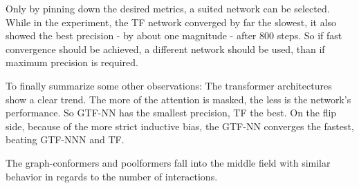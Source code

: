 Only by pinning down the desired metrics, a suited network can be selected. 
While in the experiment, the TF network converged by far the slowest, it also showed the best precision - by about one magnitude - after 800 steps. 
So if fast convergence should be achieved, a different network should be used, than if maximum precision is required.

To finally summarize some other observations: The transformer architectures show a clear trend. 
The more of the attention is masked, the less is the network's performance. 
So GTF-NN has the smallest precision, TF the best. On the flip side, because of the more strict inductive bias, the GTF-NN converges the fastest, beating GTF-NNN and TF.

The graph-conformers and poolformers fall into the middle field with similar behavior in regards to the number of interactions.
